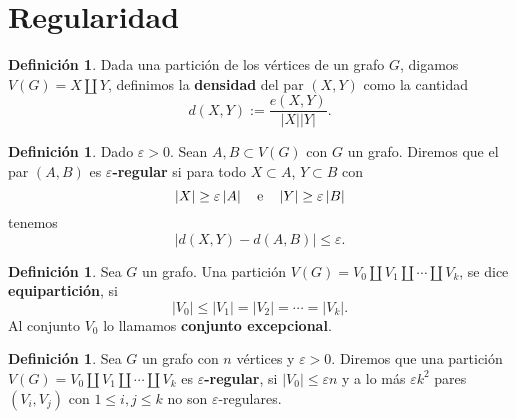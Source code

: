 \documentclass[12pt]{report}
\theoremstyle{plain}
\theoremstyle{definition}
\newtheorem{definition}[theorem]{Definición}
\newcommand{\abs}[1]{\left \vert #1 \right \vert}
\begin{document}
\section{Regularidad}

\begin{definition}
Dada una partición de los vértices de un grafo $G$, digamos $ V(G) = X \coprod Y$, definimos la \textbf{densidad} del par $(X,Y)$ como la cantidad
\[
    d(X,Y) := \frac{e(X,Y)}{\abs X \abs Y}.
\]
\end{definition}

\begin{definition}
Dado $\varepsilon > 0$. Sean $A,B \subset V(G)$ con $G$ un grafo. Diremos que el par $(A,B)$ es \textbf{$\varepsilon$-regular} si para todo $X  \subset A$, $Y \subset B$ con
\[
    \abs X \geq \varepsilon \abs A \quad \text e \quad \abs{Y} \geq \varepsilon \abs B
\]
tenemos
\[
    \abs{d (X,Y) - d(A,B)} \leq \varepsilon.
\]
\end{definition}

\begin{definition}
Sea $G$ un grafo. Una partición $V(G ) = V_0 \coprod V_1 \coprod \cdots \coprod V_k$, se dice \textbf{equipartición}, si
\[
    \abs {V_0} \leq \abs{V_1} = \abs{V_2} = \cdots = \abs{V_k}.
\]
Al conjunto $V_0$ lo llamamos \textbf{conjunto excepcional}.
\end{definition}

\begin{definition}
Sea $G$ un grafo con $n$ vértices y $\varepsilon > 0$. Diremos que una partición $V(G) = V_0 \coprod V_1 \coprod \cdots \coprod V_k$ es \textbf{$\varepsilon$-regular}, si $\abs{V_0} \leq \varepsilon n$ y a lo más $\varepsilon k^2$ pares $(V_i,V_j)$ con $1 \leq i , j \leq k$ no son $\varepsilon$-regulares.
\end{definition}
\end{document}
